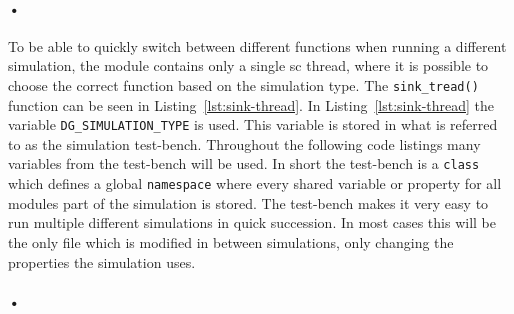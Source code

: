 \documentclass[a4paper, 12pt, openright, twoside]{report}
\newcommand{\codeword}[1]{\texttt{#1}}
\begin{document}
\paragraph{•} 
To be able to quickly switch between different functions when running a different simulation, the module contains only a single \gls{sc} thread, where it is possible to choose the correct function based on the simulation type.
The \codeword{sink\_tread()} function can be seen in Listing~\ref{lst:sink-thread}.
In Listing~\ref{lst:sink-thread} the variable \codeword{DG\_SIMULATION\_TYPE} is used.
This variable is stored in what is referred to as the simulation test-bench.
Throughout the following code listings many variables from the test-bench will be used.
In short the test-bench is a \codeword{class} which defines a global \codeword{namespace} where every shared variable or property for all modules part of the simulation is stored.
The test-bench makes it very easy to run multiple different simulations in quick succession.
In most cases this will be the only file which is modified in between simulations, only changing the properties the simulation uses.

\paragraph{•}
\begin{minipage}{\linewidth}

\end{minipage}
\end{document}
